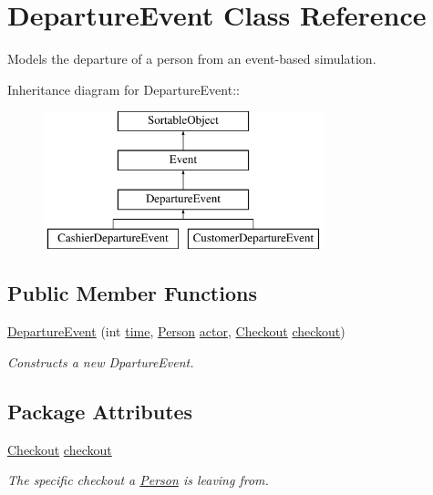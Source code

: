 \hypertarget{class_departure_event}{
\section{DepartureEvent Class Reference}
\label{class_departure_event}
}
Models the departure of a person from an event-based simulation.  


Inheritance diagram for DepartureEvent::\begin{figure}[H]
\begin{center}
\leavevmode
\includegraphics[height=4cm]{class_departure_event}
\end{center}
\end{figure}
\subsection*{Public Member Functions}
\begin{CompactItemize}
\item 
\hyperlink{class_departure_event_644fdd9d98f1aed31a3b7e1ef12729d6}{DepartureEvent} (int \hyperlink{class_event_d4c0fbb00c3fd993405df98bafcd52c5}{time}, \hyperlink{class_person}{Person} \hyperlink{class_event_28f906bdfa717a32d605aedde772d530}{actor}, \hyperlink{class_checkout}{Checkout} \hyperlink{class_departure_event_2fac3154bc1da1ab0a32c457872451a1}{checkout})
\begin{CompactList}\small\item\em Constructs a new DpartureEvent. \item\end{CompactList}\end{CompactItemize}
\subsection*{Package Attributes}
\begin{CompactItemize}
\item 
\hypertarget{class_departure_event_2fac3154bc1da1ab0a32c457872451a1}{
\hyperlink{class_checkout}{Checkout} \hyperlink{class_departure_event_2fac3154bc1da1ab0a32c457872451a1}{checkout}}
\label{class_departure_event_2fac3154bc1da1ab0a32c457872451a1}

\begin{CompactList}\small\item\em The specific checkout a \hyperlink{class_person}{Person} is leaving from. \item\end{CompactList}\end{CompactItemize}



